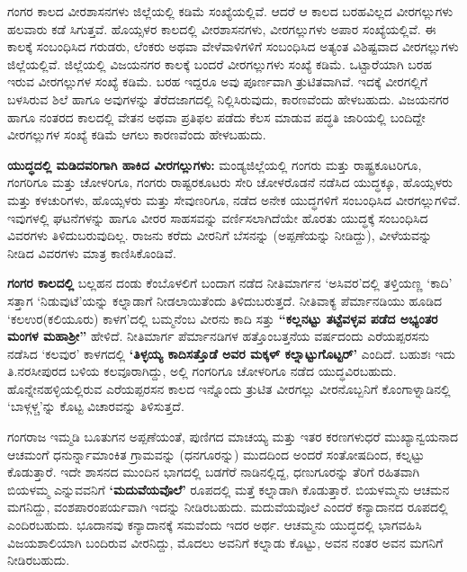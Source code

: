 ಗಂಗರ ಕಾಲದ ವೀರಶಾಸನಗಳು ಜಿಲ್ಲೆಯಲ್ಲಿ ಕಡಿಮೆ ಸಂಖ್ಯೆಯಲ್ಲಿವೆ. ಆದರೆ ಆ ಕಾಲದ ಬರಹವಿಲ್ಲದ ವೀರಗಲ್ಲುಗಳು ಹಲವಾರು ಕಡೆ ಸಿಗುತ್ತವೆ. ಹೊಯ್ಸಳರ ಕಾಲದಲ್ಲಿ ವೀರಶಾಸನಗಳು, ವೀರಗಲ್ಲುಗಳು ಅಪಾರ ಸಂಖ್ಯೆಯಲ್ಲಿವೆ. ಈ ಕಾಲಕ್ಕೆ ಸಂಬಂಧಿಸಿದ ಗರುಡರು, ಲೆಂಕರು ಅಥವಾ ವೇಳೆವಾಳಿಗಳಿಗೆ ಸಂಬಂಧಿಸಿದ ಅತ್ಯಂತ ವಿಶಿಷ್ಟವಾದ ವೀರಗಲ್ಲುಗಳು ಜಿಲ್ಲೆಯಲ್ಲಿವೆ. ಜಿಲ್ಲೆಯಲ್ಲಿ ವಿಜಯನಗರ ಕಾಲಕ್ಕೆ ಬಂದರೆ ವೀರಗಲ್ಲುಗಳು ಸಂಖ್ಯೆ ಕಡಿಮೆ. ಒಟ್ಟಾರೆಯಾಗಿ ಬರಹ ಇರುವ ವೀರಗಲ್ಲುಗಳ ಸಂಖ್ಯೆ ಕಡಿಮೆ. ಬರಹ ಇದ್ದರೂ ಅವು ಪೂರ್ಣವಾಗಿ ತ್ರುಟಿತವಾಗಿವೆ. ಇದಕ್ಕೆ ವೀರಗಲ್ಲಿಗೆ ಬಳಸಿರುವ ಶಿಲೆ ಹಾಗೂ ಅವುಗಳನ್ನು ತೆರೆದಜಾಗದಲ್ಲಿ ನಿಲ್ಲಿಸಿರುವುದು, ಕಾರಣವೆಂದು ಹೇಳಬಹುದು. ವಿಜಯನಗರ ಹಾಗೂ ನಂತರದ ಕಾಲದಲ್ಲಿ ವೇತನ ಅಥವಾ ಪ್ರತಿಫಲ ಪಡೆದು ಕೆಲಸ ಮಾಡುವ ಪದ್ಧತಿ ಜಾರಿಯಲ್ಲಿ ಬಂದಿದ್ದೇ ವೀರಗಲ್ಲುಗಳ ಸಂಖ್ಯೆ ಕಡಿಮೆ ಆಗಲು ಕಾರಣವೆಂದು ಹೇಳಬಹುದು.

\newpage

\textbf{ಯುದ್ಧದಲ್ಲಿ ಮಡಿದವರಿಗಾಗಿ ಹಾಕಿದ ವೀರಗಲ್ಲುಗಳು:} ಮಂಡ್ಯಜಿಲ್ಲೆಯಲ್ಲಿ ಗಂಗರು ಮತ್ತು ರಾಷ್ಟ್ರಕೂಟರಿಗೂ, ಗಂಗರಿಗೂ ಮತ್ತು ಚೋಳರಿಗೂ, ಗಂಗರು ರಾಷ್ಟರಕೂಟರು ಸೇರಿ ಚೋಳರೊಡನೆ ನಡೆಸಿದ ಯುದ್ಧಕ್ಕೂ, ಹೊಯ್ಸಳರು ಮತ್ತು ಕಳಚುರಿಗಳು, ಹೊಯ್ಸಳರು ಮತ್ತು ಸೇವುಣರಿಗೂ, ನಡೆದ ಅನೇಕ ಯುದ್ಧಗಳಿಗೆ ಸಂಬಂಧಿಸಿದ ವೀರಗಲ್ಲುಗಳಿವೆ. ಇವುಗಳಲ್ಲಿ ಘಟನೆಗಳನ್ನು ಹಾಗೂ ವೀರರ ಸಾಹಸವನ್ನು ವರ್ಣಿಸಲಾಗಿದೆಯೇ ಹೊರತು ಯುದ್ಧಕ್ಕೆ ಸಂಬಂಧಿಸಿದ ವಿವರಗಳು ತಿಳಿದುಬರುವುದಿಲ್ಲ. ರಾಜನು ಕರೆದು ವೀರನಿಗೆ ಬೆಸನನ್ನು (ಅಪ್ಪಣೆಯನ್ನು ನೀಡಿದ್ದು), ವೀಳೆಯವನ್ನು ನೀಡಿದ ವಿವರಗಳು ಮಾತ್ರ ಕಾಣಿಸಿಕೊಂಡಿವೆ.

\textbf{ಗಂಗರ ಕಾಲದಲ್ಲಿ} ಬಲ್ಲಹನ ದಂಡು ಕೆಂಬೊಳಲಿಗೆ ಬಂದಾಗ ನಡೆದ ನೀತಿಮಾರ್ಗನ ‘ಅಸಿವರ’ದಲ್ಲಿ ತಳ್ತಿಯಣ್ಣ ‘ಕಾದಿ’ ಸತ್ತಾಗ ‘ನಿಡುವುಟೆ’ಯನ್ನು ಕಲ್ನಾಡಾಗೆ ನೀಡಲಾಯಿತೆಂದು ತಿಳಿದುಬರುತ್ತದೆ. ನೀತಿವಾಕ್ಯ ಪೆರ್ಮಾನಡಿಯು ಹೂಡಿದ ‘ಕಲಉರ(ಕಲಿಯೂರು) ಕಾಳಗ’ದಲ್ಲಿ ಬಮ್ಮನೆಂಬ ವೀರನು ಕಾದಿ ಸತ್ತು \textbf{“ಕಲ್ಲನಟ್ಟು ತಟ್ಟೆವಳ್ಳವ ಪಡೆದ ಅಭ್ಯಂತರ ಮಂಗಳ ಮಹಾಶ‍್ರೀ”} ಹೇಳಿದೆ. ನೀತಿಮಾರ್ಗ ಪೆರ್ಮಾನಡಿಗಳ ಹತ್ತೊಂಬತ್ತನೆಯ ವರ್ಷದಂದು ಎರೆಯಪ್ಪರಸನು ನಡೆಸಿದ ‘ಕಲವುರ’ ಕಾಳಗದಲ್ಲಿ \textbf{‘ತಿಳ್ಳಯ್ಯ ಕಾದಿಸತ್ತೊಡೆ ಅವರ ಮಕ್ಕಳ್​ ಕಲ್ನಾಟ್ಟುಗೊಟ್ಟರ್​’} ಎಂದಿದೆ. ಬಹುಶಃ ಇದು ತಿ.ನರಸೀಪುರದ ಬಳಿಯ ಕಲವೂರಾಗಿದ್ದು, ಅಲ್ಲಿ ಗಂಗರಿಗೂ ಚೋಳರಿಗೂ ನಡೆದ ಯುದ್ಧವಿರಬಹುದು. ಹೊನ್ನೇನಹಳ್ಳಿಯಲ್ಲಿರುವ ಎರೆಯಪ್ಪರಸನ ಕಾಲದ ಇನ್ನೊಂದು ತ್ರುಟಿತ ವೀರಗಲ್ಲು ವೀರನೊಬ್ಬನಿಗೆ ಕೊಂಗಾಳ್ನಾಡಿನಲ್ಲಿ ‘ಬಾಳ್ಗಳ್ಚ’ನ್ನು ಕೊಟ್ಟ ವಿಚಾರವನ್ನು ತಿಳಿಸುತ್ತದೆ.

ಗಂಗರಾಜ ಇಮ್ಮಡಿ ಬೂತುಗನ ಅಪ್ಪಣೆಯಂತೆ, ಪುಣಿಗದ ಮಾಚಯ್ಯ ಮತ್ತು ಇತರ ಕರಣಗಳು\break ಧರೆ ಮುಖ್ಯಾನ್ವಯನಾದ ಆಚಮಂಗೆ ಧನುರ್ನ್ನಾಮಾಂಕಿತ ಗ್ರಾಮವನ್ನು (ಧನಗೂರನ್ನು) ಮುದದಿಂದ ಅಂದರೆ ಸಂತೋಷದಿಂದ, ಕಲ್ನಟ್ಟು ಕೊಡುತ್ತಾರೆ. ಇದೇ ಶಾಸನದ ಮುಂದಿನ ಭಾಗದಲ್ಲಿ ಬಡಗೆರೆ ನಾಡಿನಲ್ಲಿದ್ದ, ಧಣುಗೂರನ್ನು ತೆರಿಗೆ ರಹಿತವಾಗಿ ಬಿಯಳಮ್ಮ ಎನ್ನುವವನಿಗೆ \textbf{‘ಮದುವೆಯವೊಲೆ’} ರೂಪದಲ್ಲಿ ಮತ್ತೆ ಕಲ್ನಾಡಾಗಿ ಕೊಡುತ್ತಾರೆ. ಬಿಯಳಮ್ಮನು ಆಚಮನ ಮಗನಿದ್ದು, ವಂಶಪಾರಂಪರ್ಯವಾಗಿ ಇದನ್ನು ನೀಡಿರಬಹುದು. ಮದುವೆಯವೊಲೆ ಎಂದರೆ ಕನ್ಯಾದಾನದ ರೂಪದಲ್ಲಿ ಎಂದಿರಬಹುದು. ಭೂದಾನವು ಕನ್ಯಾದಾನಕ್ಕೆ ಸಮವೆಂದು ಇದರ ಅರ್ಥ. ಆಚಮ್ಮನು ಯುದ್ಧದಲ್ಲಿ ಭಾಗವಹಿಸಿ ವಿಜಯಶಾಲಿಯಾಗಿ ಬಂದಿರುವ ವೀರನಿದ್ದು, ಮೊದಲು ಅವನಿಗೆ ಕಲ್ನಾಡು ಕೊಟ್ಟು, ಅವನ ನಂತರ ಅವನ ಮಗನಿಗೆ ನೀಡಿರಬಹುದು.

